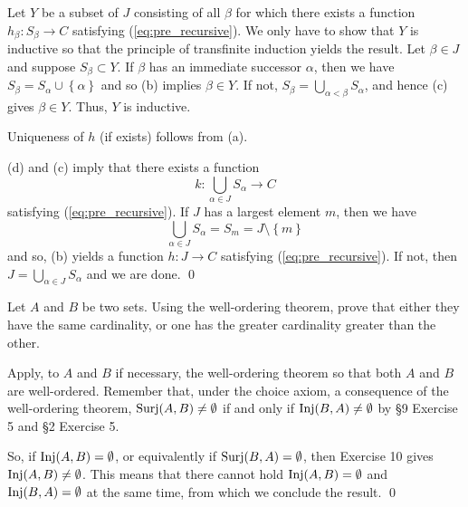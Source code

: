 \documentclass[a4paper,12pt]{article}
\begin{document}
\begin{sol}
	Let \( Y \) be a subset of \( J \)
	consisting of all \( \beta \) for which there exists a function
	\( h_{\beta}: S_{\beta}\to C\)
	satisfying (\ref{eq:pre_recursive}).
	We only have to show that \( Y \) is inductive so that
	the principle of transfinite induction yields the result.
	Let \( \beta \in J \) and suppose \( S_{\beta} \subset Y \).
	If \( \beta \) has an immediate successor \( \alpha \),
	then we have \( S_{\beta}=S_{\alpha} \cup \left\{ \alpha \right\} \)
	and so (b) implies \( \beta \in Y \).
	If not, 
	\( S_{\beta}=\bigcup_{\alpha < \beta} S_{\alpha} \),
	and hence (c) gives \( \beta \in Y \).
	Thus, \( Y \) is inductive.
	
	Uniqueness of \( h \) (if exists) follows from (a).
	
	(d) and (c) imply that there exists a function
	\begin{equation*}
		k: \bigcup_{\alpha \in J} S_{\alpha}\to C
	\end{equation*}
	satisfying (\ref{eq:pre_recursive}).
	If \( J \) has a largest element \( m \),
	then we have
	\begin{equation*}
		\bigcup_{\alpha \in J} S_{\alpha}
		=S_m
		=J \setminus \left\{ m \right\}
	\end{equation*}
	and so, (b) yields a function \( h:J\to C \)
	satisfying (\ref{eq:pre_recursive}).
	If not, then \( J=\bigcup_{\alpha \in J} S_{\alpha} \)
	and we are done.
	\qed\end{sol}

\begin{exe}
	Let \( A \) and \( B \) be two sets.
	Using the well-ordering theorem, prove that either they have the same cardinality,
	or one has the greater cardinality greater than the other.
\end{exe}
\begin{sol}
	Apply, to \( A \) and \( B \) if necessary, the well-ordering theorem
	so that both \( A \) and \( B \) are well-ordered.
	Remember that, under the choice axiom, a consequence of the well-ordering theorem,
	\( \mathrm{Surj}(A,B) \neq \emptyset \) if and only if
	\( \mathrm{Inj}(B,A) \neq \emptyset \)
	by \S9 Exercise 5 and \S2 Exercise 5.
	
	So, if \( \mathrm{Inj}(A,B) = \emptyset \),
	or equivalently if \( \mathrm{Surj}(B,A) = \emptyset \),
	then Exercise 10 gives \( \mathrm{Inj}(A,B) \neq \emptyset \).
	This means that there cannot hold
	\( \mathrm{Inj}(A,B) = \emptyset \)
	and
	\( \mathrm{Inj}(B,A) = \emptyset \)
	at the same time,
	from which we conclude the result.
	\qed\end{sol}
\end{document}
